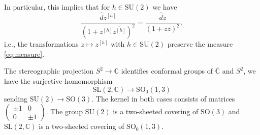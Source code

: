 \documentclass[10pt,a4paper]{amsart}
\def\SL{\mathrm {SL}}
\def\SU{\mathrm {SU}}
\def\SO{\mathrm  {SO}}
\def\C {{\mathbb C }}
\def\ov{\overline}
\def\wh{\widehat}
\def\sm{\smallskip}
\def\0{{\ov 0}}
\begin{document}
In particular, this implies that for  $h\in \SU(2)$
we have
\begin{equation}
\frac{\wh d z^{[h]}}{(1+ z^{[h]}\ov{z^{[h]}})^2}=
 \frac{\wh d z}{(1+z\ov z )^2},
\label{eq:whdzh}
\end{equation}
i.e., the transformations $z\mapsto z^{[h]}$ 
with $h\in \SU(2)$ preserve the measure \eqref{eq:measure}.






The stereographic projection $S^2\to\C$ identifies
conformal groups of $\ov\C$ and $S^2$, we have the surjective
homomorphism
$$
\SL(2,\C)\to \SO_0(1,3)
$$
sending
$\SU(2)\to \SO(3)$. The kernel in both cases consists of matrices 
$\begin{pmatrix}\pm 1&0\\0&\pm 1 \end{pmatrix}$.
The group $\SU(2)$ is a two-sheeted covering 
of  $\SO(3)$ and $\SL(2,\C)$ is a two-sheeted covering of  $\SO_0(1,3)$.



\sm 
\end{document}
